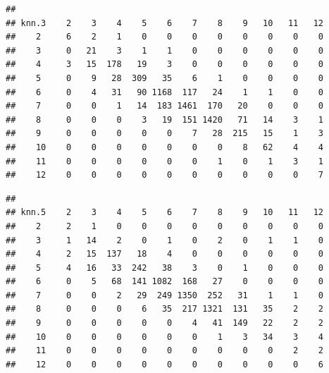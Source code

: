 \documentclass[]{article}
\newenvironment{Shaded}{\begin{snugshade}}{\end{snugshade}}
\newcommand{\KeywordTok}[1]{\textcolor[rgb]{0.13,0.29,0.53}{\textbf{{#1}}}}
\newcommand{\FloatTok}[1]{\textcolor[rgb]{0.00,0.00,0.81}{{#1}}}
\newcommand{\NormalTok}[1]{{#1}}
\begin{document}
\begin{Shaded}
\end{Shaded}

\begin{verbatim}
##      
## knn.3    2    3    4    5    6    7    8    9   10   11   12
##    2     6    2    1    0    0    0    0    0    0    0    0
##    3     0   21    3    1    1    0    0    0    0    0    0
##    4     3   15  178   19    3    0    0    0    0    0    0
##    5     0    9   28  309   35    6    1    0    0    0    0
##    6     0    4   31   90 1168  117   24    1    1    0    0
##    7     0    0    1   14  183 1461  170   20    0    0    0
##    8     0    0    0    3   19  151 1420   71   14    3    1
##    9     0    0    0    0    0    7   28  215   15    1    3
##    10    0    0    0    0    0    0    0    8   62    4    4
##    11    0    0    0    0    0    0    1    0    1    3    1
##    12    0    0    0    0    0    0    0    0    0    0    7
\end{verbatim}

\begin{Shaded}
\end{Shaded}

\begin{verbatim}
##      
## knn.5    2    3    4    5    6    7    8    9   10   11   12
##    2     2    1    0    0    0    0    0    0    0    0    0
##    3     1   14    2    0    1    0    2    0    1    1    0
##    4     2   15  137   18    4    0    0    0    0    0    0
##    5     4   16   33  242   38    3    0    1    0    0    0
##    6     0    5   68  141 1082  168   27    0    0    0    0
##    7     0    0    2   29  249 1350  252   31    1    1    0
##    8     0    0    0    6   35  217 1321  131   35    2    2
##    9     0    0    0    0    0    4   41  149   22    2    2
##    10    0    0    0    0    0    0    1    3   34    3    4
##    11    0    0    0    0    0    0    0    0    0    2    2
##    12    0    0    0    0    0    0    0    0    0    0    6
\end{verbatim}

\begin{Shaded}
\end{Shaded}
\end{document}
